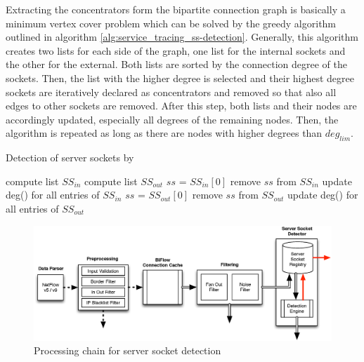 Extracting the concentrators form the bipartite connection graph is basically a minimum vertex cover problem which can be solved by the greedy algorithm outlined in algorithm \ref{alg:service_tracing_ss-detection}. 
Generally, this algorithm creates two lists for each side of the graph, one list for the internal sockets and the other for the external. 
Both lists are sorted by the connection degree of the sockets. 
Then, the list with the higher degree is selected and their highest degree sockets are iteratively declared as concentrators and removed so that also all edges to other sockets are removed. 
After this step, both lists and their nodes are accordingly updated, especially all degrees of the remaining nodes. 
Then, the algorithm is repeated as long as there are nodes with higher degrees than $deg_{lim}$. 

\begin{algorithm}[t!]
\caption{Detection of server sockets by \citet{Schatzmann:Mining,Schatzmann:Dissection, Schatzmann:Tracing}}
\label{alg:service_tracing_ss-detection}
\begin{algorithmic}
\STATE
\STATE compute list $SS_{in}$ 
\STATE compute list $SS_{out}$ 
\STATE
{}
        \STATE $ss$ = $SS_{in}[0]$ 
        \STATE remove $ss$ from $SS_{in}$
        \STATE update deg() for all entries of $SS_{in}$
    \ENDWHILE
        \STATE $ss$ = $SS_{out}[0]$ 
        \STATE remove $ss$ from $SS_{out}$
        \STATE update deg() for all entries of $SS_{out}$
    \ENDWHILE
\ENDWHILE
\end{algorithmic}
\end{algorithm}

\begin{figure}
	[ht] \centering
	\includegraphics[width=\linewidth]{images/Detection_chain.eps}
	\caption{Processing chain for server socket detection}
	\label{fig:detection_chain}
\end{figure}

